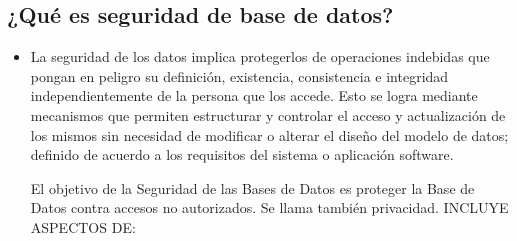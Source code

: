 \documentclass[%
 reprint,
 amsmath,amssymb,
 aps,
]{revtex4-1}
\begin{document}
\subsection{¿Qué es seguridad de base de datos?}
\begin{itemize}
	\item La seguridad de los datos implica protegerlos de operaciones indebidas que pongan en peligro su definición, existencia, consistencia e integridad independientemente de la persona que los accede. Esto se logra mediante mecanismos que permiten estructurar y controlar el acceso y actualización de los mismos sin necesidad de modificar o alterar el diseño del modelo de datos; definido de acuerdo a los requisitos del sistema o aplicación software.
	\par El objetivo de la Seguridad de las Bases de Datos es proteger la Base de Datos contra accesos no autorizados. Se llama también privacidad. INCLUYE ASPECTOS DE:


\end{itemize}
\end{document}
